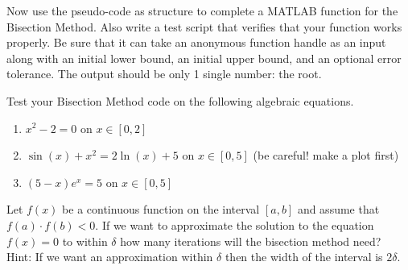 \begin{problem}
    Now use the pseudo-code as structure to complete a MATLAB function for the Bisection
    Method.  Also write a test script that verifies that your function works properly. Be
    sure that it can take an anonymous function handle as an input along with an initial
    lower bound, an initial upper bound, and an optional error tolerance. The output
    should be only 1 single number: the root.\\
\end{problem}

\begin{problem}
    Test your Bisection Method code on the following algebraic equations.
    \begin{enumerate}
        \item $x^2 - 2 = 0$ on $x \in [0,2]$ 
        \item $\sin(x) + x^2 = 2\ln(x) + 5$ on $x \in [0,5]$ (be careful! make a plot
            first) 
        \item $(5-x)e^{x}=5$ on $x \in [0,5]$
    \end{enumerate}
\end{problem}


\begin{problem}
    Let $f(x)$ be a continuous function on the interval $[a,b]$ and assume that $f(a)
    \cdot f(b) <0$.  If we want to approximate the solution to the equation $f(x)=0$ to
    within $\delta$ how many iterations will the bisection method need? \\ Hint: If we
    want an approximation within $\delta$ then the width of the interval is $2\delta$.
\end{problem}


